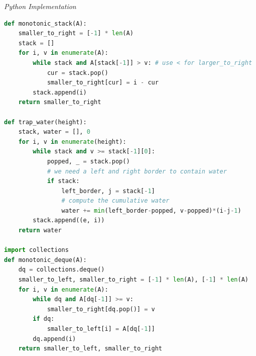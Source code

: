 \documentclass{article}
\begin{document}
\vspace{8pt} \emph{Python Implementation}
\begin{lstlisting}[language=Python]
def monotonic_stack(A):
    smaller_to_right = [-1] * len(A)
    stack = []
    for i, v in enumerate(A):
        while stack and A[stack[-1]] > v: # use < for larger_to_right
            cur = stack.pop()
            smaller_to_right[cur] = i - cur
        stack.append(i)
    return smaller_to_right

def trap_water(height):
    stack, water = [], 0
    for i, v in enumerate(height):
        while stack and v >= stack[-1][0]:
            popped, _ = stack.pop()
            # we need a left and right border to contain water
            if stack:
                left_border, j = stack[-1]
                # compute the cumulative water
                water += min(left_border-popped, v-popped)*(i-j-1)
        stack.append((e, i))
    return water

import collections
def monotonic_deque(A):
    dq = collections.deque()
    smaller_to_left, smaller_to_right = [-1] * len(A), [-1] * len(A)
    for i, v in enumerate(A):
        while dq and A[dq[-1]] >= v: 
            smaller_to_right[dq.pop()] = v 
        if dq:  
            smaller_to_left[i] = A[dq[-1]]
        dq.append(i)
    return smaller_to_left, smaller_to_right
\end{lstlisting}
\end{document}
